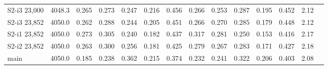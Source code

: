 \begin{longtable}{lrcccccccccccc}
S2-i3 23,000 & 4048.3 & 0.265 & 0.273 & 0.247 & 0.216 & 0.456 & 0.266 & 0.253 & 0.287 & 0.195 & 0.452 & 2.12 \\
S2-i3 23,852 & 4050.0 & 0.262 & 0.288 & 0.244 & 0.205 & 0.451 & 0.266 & 0.270 & 0.285 & 0.179 & 0.448 & 2.12 \\
S2-i1 23,852 & 4050.0 & 0.273 & 0.305 & 0.240 & 0.182 & 0.437 & 0.317 & 0.281 & 0.250 & 0.153 & 0.416 & 2.17 \\
S2-i2 23,852 & 4050.0 & 0.263 & 0.300 & 0.256 & 0.181 & 0.425 & 0.279 & 0.267 & 0.283 & 0.171 & 0.427 & 2.18 \\
main & 4050.0 & 0.185 & 0.238 & 0.362 & 0.215 & 0.374 & 0.232 & 0.241 & 0.322 & 0.206 & 0.403 & 2.08 \\
\end{longtable}
